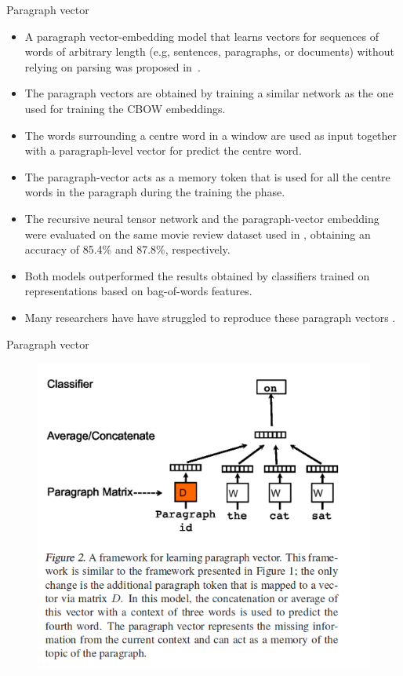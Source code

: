 \documentclass[handout]{beamer}
\begin{document}
\begin{frame}{Paragraph vector}
\begin{scriptsize}
\begin{itemize}
\item A paragraph vector-embedding model that learns vectors for sequences of words of arbitrary length (e.g, sentences, paragraphs, or documents) without relying on parsing was proposed in~\cite{LeM14}. 
\item The paragraph vectors are obtained by training a similar network as the one used for training the CBOW embeddings. 
\item The words surrounding a centre word in a window are used as input together with a paragraph-level vector for predict the centre word. 
\item The paragraph-vector acts as a memory token that is used for all the centre words in the paragraph during the training the phase. 
\item The recursive neural tensor network and the paragraph-vector embedding were evaluated on the same movie review dataset used in \cite{Pang2002}, obtaining an accuracy of 85.4\% and 87.8\%, respectively. 
\item Both models outperformed the results obtained by classifiers trained on representations based on bag-of-words features.
\item Many researchers have have  struggled  to  reproduce these paragraph vectors \cite{lau2016empirical}.  
\end{itemize}
\end{scriptsize}
\end{frame}


\begin{frame}{Paragraph vector}
   
    \begin{figure}[h]
        	\includegraphics[scale = 0.45]{pics/doc2vec.png}
        \end{figure}       
        
\end{frame}
\end{document}

